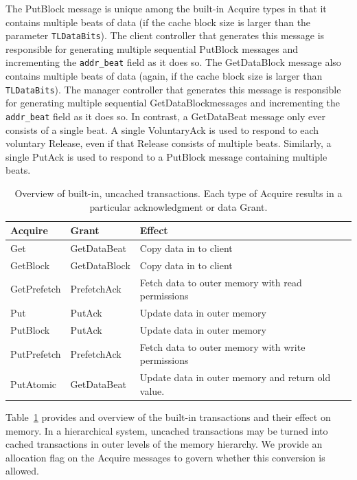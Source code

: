 The PutBlock message is unique among the built-in Acquire types in that it contains multiple beats of data (if the cache block size is larger than the parameter {\tt TLDataBits}).
The client controller that generates this message is responsible for generating multiple sequential PutBlock messages and incrementing the {\tt addr\_beat} field as it does so.
The GetDataBlock message also contains multiple beats of data (again, if the cache block size is larger than {\tt TLDataBits}).
The manager controller that generates this message is responsible for generating multiple sequential GetDataBlockmessages and incrementing the {\tt addr\_beat} field as it does so.
In contrast, a GetDataBeat message only ever consists of a single beat.
A single VoluntaryAck is used to respond to each voluntary Release, even if that Release consists of multiple beats.
Similarly, a single PutAck is used to respond to a PutBlock message containing multiple beats.

\begin{table}[ht]
\begin{center}
\begin{tabular}{|l|l|l|}
    \hline
    Acquire & Grant & Effect \\ \hline \hline
    Get & GetDataBeat & Copy data in to client \\ \hline
    GetBlock & GetDataBlock & Copy data in to client \\ \hline
    GetPrefetch & PrefetchAck & Fetch data to outer memory with read permissions \\ \hline
    Put & PutAck & Update data in outer memory \\ \hline
    PutBlock & PutAck & Update data in outer memory \\ \hline
    PutPrefetch & PrefetchAck & Fetch data to outer memory with write permissions \\ \hline
    PutAtomic & GetDataBeat & Update data in outer memory and return old value. \\ \hline
\end{tabular}
\end{center}
\caption{Overview of built-in, uncached transactions. Each type of Acquire results in a particular acknowledgment or data Grant.}
\label{tab:uncached}
\end{table}

Table~\ref{tab:uncached} provides and overview of the built-in transactions and their effect on memory.
In a hierarchical system, uncached transactions may be turned into cached transactions in outer levels of the memory hierarchy.
We provide an allocation flag on the Acquire messages to govern whether this conversion is allowed.

